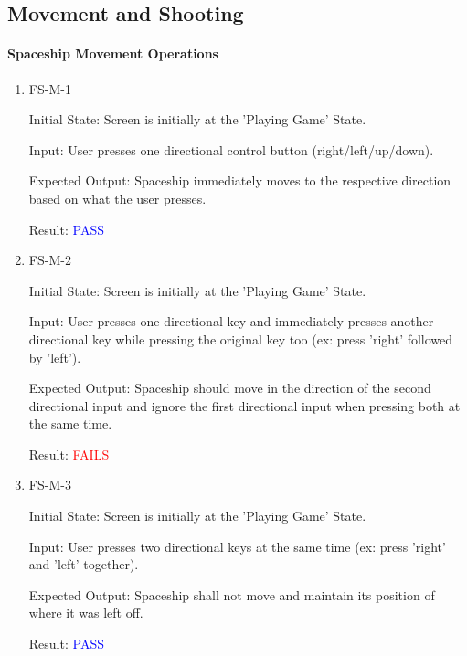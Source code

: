 \documentclass[12pt, titlepage]{article}
\begin{document}
\subsection{Movement and Shooting}

\paragraph{Spaceship Movement Operations}

\begin{enumerate}

\item{FS-M-1\\}

Initial State: Screen is initially at the 'Playing Game' State. 
					
Input: User presses one directional control button (right/left/up/down). 
					
Expected Output: Spaceship immediately moves to the respective direction based on what the user presses.  
					
Result: \textcolor{blue}{PASS}

\item{FS-M-2\\}

Initial State: Screen is initially at the 'Playing Game' State. 
					
Input: User presses one directional key and immediately presses another directional key while pressing the original key too (ex: press 'right' followed by 'left'). 
					
Expected Output: Spaceship should move in the direction of the second directional input and ignore the first directional input when pressing both at the same time. 
					
Result: \textcolor{red}{FAILS}

\item{FS-M-3\\}

Initial State: Screen is initially at the 'Playing Game' State. 
					
Input: User presses two directional keys at the same time (ex: press 'right' and 'left' together). 
					
Expected Output: Spaceship shall not move and maintain its position of where it was left off.
					
Result: \textcolor{blue}{PASS}

\end{enumerate}
\end{document}
